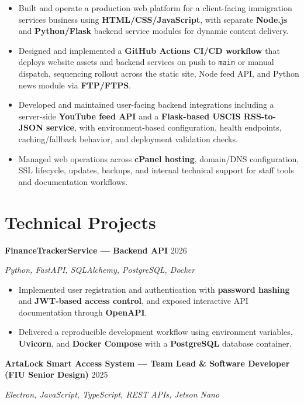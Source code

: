 \documentclass[10pt]{article}
\begin{document}
\begin{itemize}
\item Built and operate a production web platform for a client-facing immigration services business using \textbf{HTML/CSS/JavaScript}, with separate \textbf{Node.js} and \textbf{Python/Flask} backend service modules for dynamic content delivery.
\item Designed and implemented a \textbf{GitHub Actions CI/CD workflow} that deploys website assets and backend services on push to \texttt{main} or manual dispatch, sequencing rollout across the static site, Node feed API, and Python news module via \textbf{FTP/FTPS}.
\item Developed and maintained user-facing backend integrations including a server-side \textbf{YouTube feed API} and a \textbf{Flask-based USCIS RSS-to-JSON service}, with environment-based configuration, health endpoints, caching/fallback behavior, and deployment validation checks.
\item Managed web operations across \textbf{cPanel hosting}, domain/DNS configuration, SSL lifecycle, updates, backups, and internal technical support for staff tools and documentation workflows.
\end{itemize}

\section{Technical Projects}

\textbf{FinanceTrackerService --- Backend API} \hfill 2026

\textit{Python, FastAPI, SQLAlchemy, PostgreSQL, Docker}

\begin{itemize}
\item Implemented user registration and authentication with \textbf{password hashing} and \textbf{JWT-based access control}, and exposed interactive API documentation through \textbf{OpenAPI}.
 \item Delivered a reproducible development workflow using environment variables, \textbf{Uvicorn}, and \textbf{Docker Compose} with a \textbf{PostgreSQL} database container.
 \end{itemize}

\textbf{ArtaLock Smart Access System --- Team Lead \& Software Developer (FIU Senior Design)} \hfill 2025

\textit{Electron, JavaScript, TypeScript, REST APIs, Jetson Nano}
\end{document}
